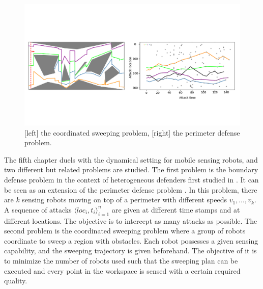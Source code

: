 \begin{figure}[h]
    \centering
    \vspace{-.8in}
    \includegraphics[width=.8\textwidth]{figures/dynamic-intro.png}
    \vspace{-.5in}
    \caption[Illustration of sweeping and boundary defense]{[left] the coordinated sweeping problem, [right] the perimeter defense problem.}
    \label{fig:intro-bd-sc}
\end{figure}

The fifth chapter duels with the dynamical setting for mobile sensing robots, 
and two different but related problems are studied. 
The first problem is the boundary defense problem in the context of heterogeneous defenders first studied in \cite{adler2022role}.
It can be seen as an extension of the perimeter defense problem \cite{shishika2020review}. 
In this problem, there are $k$ sensing robots moving on top of a perimeter with different speeds $v_1,\dots,v_k$.
A sequence of attacks $\langle loc_i, t_i \rangle_{i=1}^{n}$ are given at different time stamps and at different locations.
The objective is to intercept as many attacks as possible.
The second problem is the coordinated sweeping problem where a group of robots coordinate to sweep a region 
with obstacles. Each robot possesses a given sensing capability, and the sweeping trajectory is 
given beforehand. The objective of it is to minimize the number of robots used such that the sweeping plan 
can be executed and every point in the workspace is sensed with a certain required quality. 

